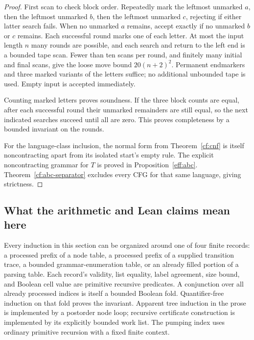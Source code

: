 \begin{proof}
First scan to check block order.  Repeatedly mark the leftmost unmarked
$a$, then the leftmost unmarked $b$, then the leftmost unmarked $c$,
rejecting if either latter search fails.  When no unmarked $a$ remains,
accept exactly if no unmarked $b$ or $c$ remains.  Each successful round
marks one of each letter.  At most the input length $n$ many rounds are
possible, and each search and return to the left end is a bounded tape
scan.  Fewer than ten scans per round, and finitely many initial and
final scans, give the loose move bound $20(n+2)^2$.  Permanent endmarkers
and three marked variants of the letters suffice; no additional unbounded
tape is used.  Empty input is accepted immediately.

Counting marked letters proves soundness.  If the three block counts
are equal, after each successful round their unmarked remainders are
still equal, so the next indicated searches succeed until all are zero.
This proves completeness by a bounded invariant on the rounds.

For the language-class inclusion, the normal form from
Theorem~\ref{cf:cnf} is itself noncontracting apart from its isolated
start's empty rule.  The explicit noncontracting grammar for $T$ is
proved in Proposition~\ref{eff:abc}.  Theorem~\ref{cf:abc-separator}
excludes every CFG for that same language, giving strictness.
\end{proof}

\subsection{What the arithmetic and Lean claims mean here}
\label{cf:audit}

Every induction in this section can be organized around one of four
finite records: a processed prefix of a node table, a processed prefix
of a supplied transition trace, a bounded grammar-enumeration table, or
an already filled portion of a parsing table.  Each record's validity,
list equality, label agreement, size bound, and Boolean cell value are
primitive recursive predicates.  A conjunction over all already processed
indices is itself a bounded Boolean fold.  Quantifier-free induction on
that fold proves the invariant.  Apparent tree induction in the prose is
implemented by a postorder node loop; recursive certificate construction
is implemented by its explicitly bounded work list.  The pumping index
uses ordinary primitive recursion with a fixed finite context.

